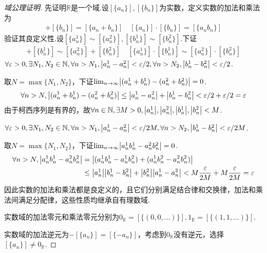 \begin{proof}[域公理证明]
    先证明\(\mathbb{R}\)是一个域.设\([\{a_n\}],[\{b_n\}]\)为实数，定义实数的加法和乘法为
    \begin{align*}
        [\{a_n\}]+[\{b_n\}]=[\{a_n+b_n\}] \quad
        [\{a_n\}] \cdot [\{b_n\}]=[\{a_nb_n\}]
    \end{align*}
    验证其良定义性.设\([\{a_n^1\}] \sim [\{a_n^2\}],[\{b_n^1\}] \sim [\{b_n^2\}]\).下证
    \begin{align*}
        [\{a_n^1\}]+[\{b_n^1\}] \sim [\{a_n^2\}]+[\{b_n^2\}] \quad
        [\{a_n^1\}] \cdot [\{b_n^1\}] \sim [\{a_n^2\}] \cdot [\{b_n^2\}]
    \end{align*}
    \(\forall \varepsilon>0, \exists N_1,N_2 \in \mathbb{N}, \forall n>N_1, \abs*{a_n^1-a_n^2}<\varepsilon/2, \forall n>N_2, \abs*{b_n^1-b_n^2}<\varepsilon/2\).
    
    取\(N=\max\{N_1,N_2\}\)，下证\(\lim_{n \to \infty}\abs*{(a_n^1+b_n^1)-(a_n^2+b_n^2)}=0\).
    \begin{align*}
        \forall n>N, \abs*{(a_n^1+b_n^1)-(a_n^2+b_n^2)} \leq \abs*{a_n^1-a_n^2}+\abs*{b_n^1-b_n^2}<\varepsilon/2+\varepsilon/2=\varepsilon
    \end{align*}
    由于柯西序列是有界的，故\(\forall n \in \mathbb{N}, \exists M>0, \abs*{a_n^1},\abs*{a_n^2},\abs*{b_n^1},\abs*{b_n^2}<M\).

    \(\forall \varepsilon>0, \exists N_1,N_2 \in \mathbb{N}, \forall n>N_1, \abs*{a_n^1-a_n^2}<\varepsilon/2M, \forall n>N_2, \abs*{b_n^1-b_n^2}<\varepsilon/2M\).

    取\(N=\max\{N_1,N_2\}\)，下证\(\lim_{n \to \infty}\abs*{a_n^1b_n^1-a_n^2b_n^2}=0\).
    \begin{align*}
        \forall n>N, \abs*{a_n^1b_n^1-a_n^2b_n^2}&=\abs*{(a_n^1b_n^1-a_n^1b_n^2)+(a_n^1b_n^2-a_n^2b_n^2)} \\
        &\leq \abs*{a_n^1}\abs*{b_n^1-b_n^2}+\abs*{b_n^2}\abs*{a_n^1-a_n^2}
        <M\frac{\varepsilon}{2M}+M\frac{\varepsilon}{2M}=\varepsilon
    \end{align*}
    {\kaishu 因此实数的加法和乘法都是良定义的，且它们分别满足结合律和交换律，加法和乘法间满足分配律，这些性质均继承自有理数域.}

    实数域的加法零元和乘法零元分别为\(0_{\mathbb{R}}=[\{(0,0,\dots)\}], 1_{\mathbb{R}}=[\{(1,1,\dots)\}]\).

    实数域的加法逆元为\(-[\{a_n\}]=[\{-a_n\}]\)，考虑到\(0_{\mathbb{R}}\)没有逆元，选择\([\{a_n\}] \ne 0_{\mathbb{R}}\).


\end{proof}
